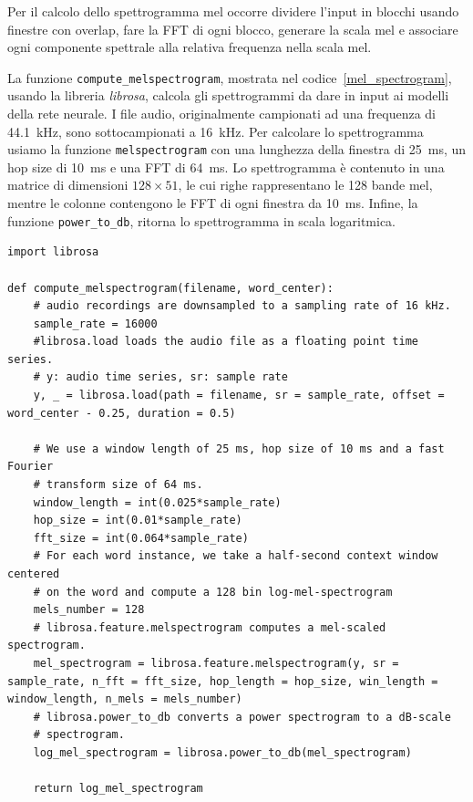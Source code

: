 \documentclass[12pt,a4paper,titlepage]{article}
\begin{document}
Per il calcolo dello spettrogramma mel occorre dividere l'input in blocchi usando finestre con overlap, fare la FFT di ogni blocco, generare la scala mel e associare ogni componente spettrale alla relativa frequenza nella scala mel.    

La funzione \texttt{compute\_melspectrogram}, mostrata nel codice~\ref{mel_spectrogram}, usando la libreria \emph{librosa}, calcola gli spettrogrammi da dare in input ai modelli della rete neurale. I file audio, originalmente campionati ad una frequenza di \SI{44.1}{\kilo \hertz}, sono sottocampionati a \SI{16}{\kilo \hertz}. Per calcolare lo spettrogramma usiamo la funzione \texttt{melspectrogram} con una lunghezza della finestra di \SI{25}{\milli \second}, un hop size di \SI{10}{\milli \second} e una FFT di \SI{64}{\milli \second}. Lo spettrogramma è contenuto in una matrice di dimensioni $128 \times 51$, le cui righe rappresentano le 128 bande mel, mentre le colonne contengono le FFT di ogni finestra da \SI{10}{\milli \second}. Infine, la funzione \texttt{power\_to\_db}, ritorna lo spettrogramma in scala logaritmica.

\begin{lstlisting}[language=iPython,firstnumber=1, caption=mel\_spectrogram.py, label=mel_spectrogram,captionpos=b]
import librosa

def compute_melspectrogram(filename, word_center):
    # audio recordings are downsampled to a sampling rate of 16 kHz.
    sample_rate = 16000
    #librosa.load loads the audio file as a floating point time series.
    # y: audio time series, sr: sample rate
    y, _ = librosa.load(path = filename, sr = sample_rate, offset = word_center - 0.25, duration = 0.5)

    # We use a window length of 25 ms, hop size of 10 ms and a fast Fourier
    # transform size of 64 ms.
    window_length = int(0.025*sample_rate)
    hop_size = int(0.01*sample_rate)
    fft_size = int(0.064*sample_rate)
    # For each word instance, we take a half-second context window centered
    # on the word and compute a 128 bin log-mel-spectrogram
    mels_number = 128
    # librosa.feature.melspectrogram computes a mel-scaled spectrogram.
    mel_spectrogram = librosa.feature.melspectrogram(y, sr = sample_rate, n_fft = fft_size, hop_length = hop_size, win_length = window_length, n_mels = mels_number)
    # librosa.power_to_db converts a power spectrogram to a dB-scale
    # spectrogram.
    log_mel_spectrogram = librosa.power_to_db(mel_spectrogram)
    
    return log_mel_spectrogram
\end{lstlisting}
\end{document}
